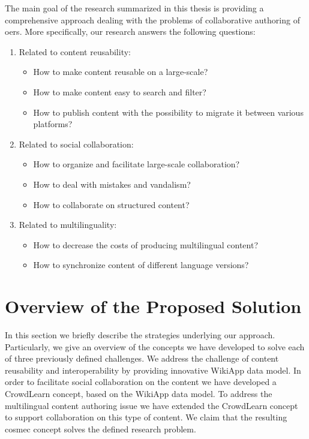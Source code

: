 \documentclass[PhD, Submit, ngerman,UKenglish,table]{scrbook}
\begin{document}
The main goal of the research summarized in this thesis is providing a comprehensive approach dealing with the problems of collaborative authoring of \gls{oer}s.
More specifically, our research answers the following questions:
\begin{enumerate}
\item Related to content reusability: 
\begin{itemize}
\item How to make content reusable on a large-scale?
\item How to make content easy to search and filter?
\item How to publish content with the possibility to migrate it between various platforms?
\end{itemize} 
\item Related to social collaboration: 
\begin{itemize}
\item How to organize and facilitate large-scale collaboration?
\item How to deal with mistakes and vandalism?
\item How to collaborate on structured content?
\end{itemize}
\item Related to multilinguality: 
\begin{itemize}
\item How to decrease the costs of producing multilingual content?
\item How to synchronize content of different language versions?
\end{itemize}
\end{enumerate}


\section{Overview of the Proposed Solution}
In this section we briefly describe the strategies underlying our approach.
Particularly, we give an overview of the concepts we have developed to solve each of three previously defined challenges. 
We address the challenge of content reusability and interoperability by providing innovative WikiApp data model.
In order to facilitate social collaboration on the content we have developed a CrowdLearn concept, based on the WikiApp data model.
To address the multilingual content authoring issue we have extended the CrowdLearn concept to support collaboration on this type of content.
We claim that the resulting \gls{cosmec} concept solves the defined research problem.
\end{document}
